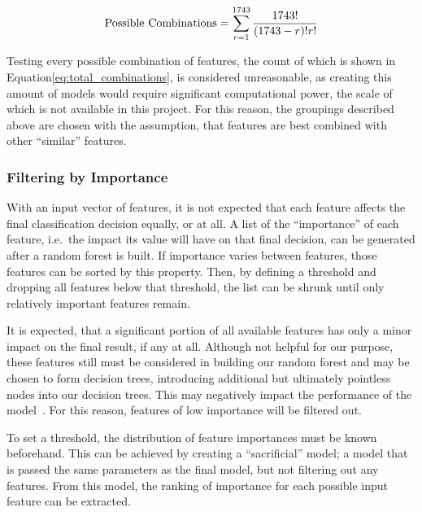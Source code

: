 \begin{equation}\label{eq:total_combinations}
    \text{Possible Combinations} = \sum_{r = 1}^{1743{}}\frac{1743{}!}{(1743{} - r)!r!}
\end{equation}

Testing every possible combination of \featureCount{} features, the count of which is shown in
Equation\ref{eq:total_combinations}, is considered unreasonable, as creating 
this amount of models would require significant computational power, the scale
of which is not available in this project. For this reason, the groupings 
described above are chosen with the assumption, that features are best combined
with other \enquote{similar} features.

\subsubsection{Filtering by Importance}\label{sec:filtering_importance}

With an input vector of \featureCount{} features, it is not expected that each feature 
affects the final classification decision equally, or at all. 
A list of the \enquote{importance} of each feature, i.e.~the impact its value 
will have on that final decision, can be generated after a random forest is 
built. If importance varies between features, those features can be sorted by
this property. Then, by defining a threshold and dropping all features below 
that threshold, the list can be shrunk until only relatively important features
remain.

It is expected, that a significant portion of all available features has only
a minor impact on the final result, if any at all. Although not helpful for our 
purpose, these features still must be considered in building our random forest 
and may be chosen to form decision trees, introducing additional but ultimately 
pointless nodes into our decision trees. This may negatively impact the 
performance of the model~\cite{elements_of_statistical_learning}.
For this reason, features of low importance will be filtered out.

To set a threshold, the distribution of feature importances must be known 
beforehand. This can be achieved by creating a \enquote{sacrificial} model; a
model that is passed the same parameters as the final model, but not filtering 
out any features. From this model, the ranking of importance for each possible
input feature can be extracted.

